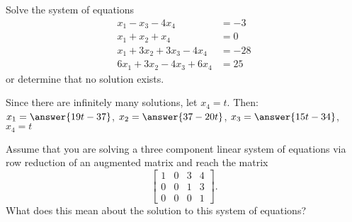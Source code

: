 \documentclass{ximera}
\begin{document}
\begin{exercise}%
    Solve the system of equations
    \begin{equation*}
        \begin{split}
            x_1 - x_3 - 4x_4 &= -3 \\
            x_1 + x_2 + x_4 &= 0\\
            x_1 + 3x_2 + 3x_3 - 4x_4 &= -28 \\
            6x_1 + 3x_2 - 4x_3 + 6x_4 &= 25
        \end{split}
    \end{equation*}
    or determine that no solution exists. 
    \begin{multipleChoice}
    \end{multipleChoice}
    \begin{problem}
        Since there are infinitely many solutions, let $x_4 = t$. Then: $x_1 = \answer{19t - 37}$, $x_2 = \answer{37 - 20t}$, $x_3 = \answer{15t - 34}$, $x_4 = t$
    \end{problem}
\end{exercise}

\begin{exercise}%
    Assume that you are solving a three component linear system of equations via row reduction of an augmented matrix and reach the matrix
    \begin{equation*}
        \left[ 
        \begin{array}{ccc|c}
            1 & 0 & 3 & 4 \\
            0 & 0 & 1 & 3 \\
            0 & 0 & 0 & 1
        \end{array}
        \right].
    \end{equation*}
    What does this mean about the solution to this system of equations?
    \begin{multipleChoice}
    \end{multipleChoice}
\end{exercise}
\end{document}
